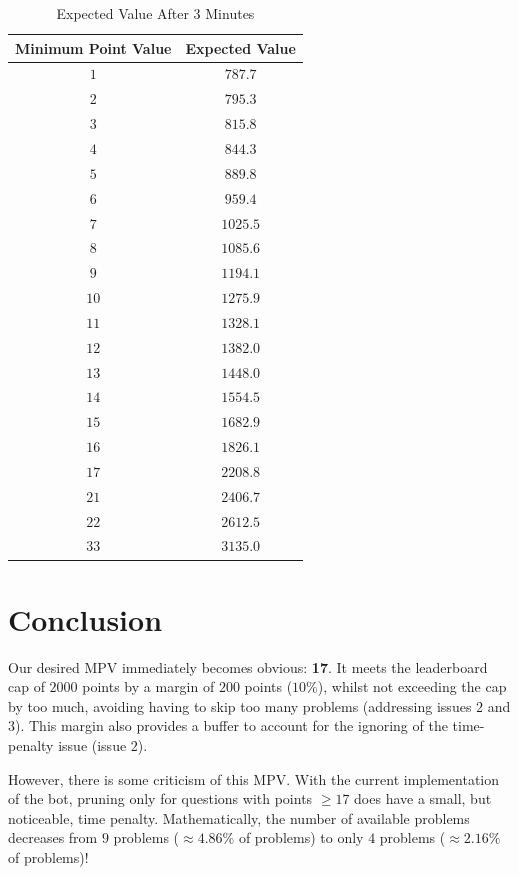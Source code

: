 \documentclass{article}
\begin{document}
\begin{table}[H]
    \begin{tabular}{|c|c|}
        \hline
        \textbf{Minimum Point Value} & \textbf{Expected Value} \\
        \hline
        \hline

        $1$ & $787.7$ \\
        $2$ & $795.3$ \\
        $3$ & $815.8$ \\
        $4$ & $844.3$ \\
        $5$ & $889.8$ \\
        $6$ & $959.4$ \\
        $7$ & $1025.5$ \\
        $8$ & $1085.6$ \\
        $9$ & $1194.1$ \\
        $10$ & $1275.9$ \\
        $11$ & $1328.1$ \\
        $12$ & $1382.0$ \\
        $13$ & $1448.0$ \\
        $14$ & $1554.5$ \\
        $15$ & $1682.9$ \\
        $16$ & $1826.1$ \\
        $17$ & $2208.8$ \\
        $21$ & $2406.7$ \\
        $22$ & $2612.5$ \\
        $33$ & $3135.0$ \\

        \hline
    \end{tabular}
    \centering
    \caption{Expected Value After 3 Minutes}\label{table:final_expected_value}
\end{table}

\section{Conclusion}
Our desired MPV immediately becomes obvious: \textbf{17}. It meets the leaderboard cap of $2000$ points by a margin of $200$ points ($10\%$), whilst not exceeding the cap by too much, avoiding having to skip too many problems (addressing issues $2$ and $3$). This margin also provides a buffer to account for the ignoring of the time-penalty issue (issue $2$).

However, there is some criticism of this MPV. With the current implementation of the bot, pruning only for questions with points $\geq 17$ does have a small, but noticeable, time penalty. Mathematically, the number of available problems decreases from $9$ problems ($\approx 4.86\%$ of problems) to only $4$ problems ($\approx 2.16\%$ of problems)! 
\end{document}

